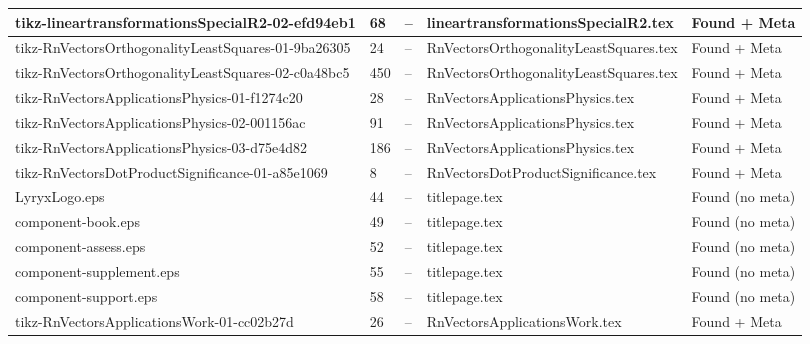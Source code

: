 \documentclass[11pt]{article}
\begin{document}
\begin{longtable}{|p{3.5cm}|p{1.5cm}|p{1cm}|p{4cm}|p{2cm}|}
tikz-lineartransformationsSpecialR2-02-efd94eb1 & 68 & -- & lineartransformationsSpecialR2.tex & \textcolor{found}{Found + Meta} \\
\hline

tikz-RnVectorsOrthogonalityLeastSquares-01-9ba26305 & 24 & -- & RnVectorsOrthogonalityLeastSquares.tex & \textcolor{found}{Found + Meta} \\
\hline

tikz-RnVectorsOrthogonalityLeastSquares-02-c0a48bc5 & 450 & -- & RnVectorsOrthogonalityLeastSquares.tex & \textcolor{found}{Found + Meta} \\
\hline

tikz-RnVectorsApplicationsPhysics-01-f1274c20 & 28 & -- & RnVectorsApplicationsPhysics.tex & \textcolor{found}{Found + Meta} \\
\hline

tikz-RnVectorsApplicationsPhysics-02-001156ac & 91 & -- & RnVectorsApplicationsPhysics.tex & \textcolor{found}{Found + Meta} \\
\hline

tikz-RnVectorsApplicationsPhysics-03-d75e4d82 & 186 & -- & RnVectorsApplicationsPhysics.tex & \textcolor{found}{Found + Meta} \\
\hline

tikz-RnVectorsDotProductSignificance-01-a85e1069 & 8 & -- & RnVectorsDotProductSignificance.tex & \textcolor{found}{Found + Meta} \\
\hline

LyryxLogo.eps & 44 & -- & titlepage.tex & \textcolor{warning}{Found (no meta)} \\
\hline

component-book.eps & 49 & -- & titlepage.tex & \textcolor{warning}{Found (no meta)} \\
\hline

component-assess.eps & 52 & -- & titlepage.tex & \textcolor{warning}{Found (no meta)} \\
\hline

component-supplement.eps & 55 & -- & titlepage.tex & \textcolor{warning}{Found (no meta)} \\
\hline

component-support.eps & 58 & -- & titlepage.tex & \textcolor{warning}{Found (no meta)} \\
\hline

tikz-RnVectorsApplicationsWork-01-cc02b27d & 26 & -- & RnVectorsApplicationsWork.tex & \textcolor{found}{Found + Meta} \\
\hline


\end{longtable}
\end{document}
